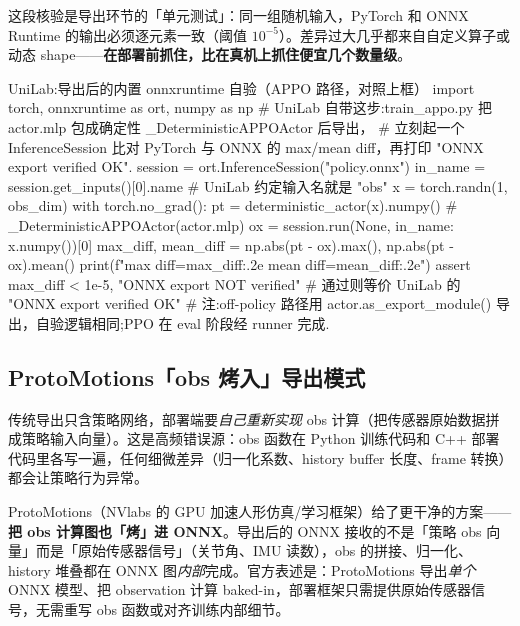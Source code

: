 这段核验是导出环节的「单元测试」：同一组随机输入，PyTorch 和 ONNX Runtime 的输出必须逐元素一致（阈值 $10^{-5}$）。差异过大几乎都来自自定义算子或动态 shape——\textbf{在部署前抓住，比在真机上抓住便宜几个数量级}。

\begin{codebox}[Python]{UniLab:导出后的内置 onnxruntime 自验（APPO 路径，对照上框）}
import torch, onnxruntime as ort, numpy as np
# UniLab 自带这步:train_appo.py 把 actor.mlp 包成确定性 _DeterministicAPPOActor 后导出，
# 立刻起一个 InferenceSession 比对 PyTorch 与 ONNX 的 max/mean diff，再打印 "ONNX export verified OK".
session = ort.InferenceSession("policy.onnx")
in_name = session.get_inputs()[0].name             # UniLab 约定输入名就是 "obs"
x = torch.randn(1, obs_dim)
with torch.no_grad():
    pt = deterministic_actor(x).numpy()            # _DeterministicAPPOActor(actor.mlp)
ox = session.run(None, {in_name: x.numpy()})[0]
max_diff, mean_diff = np.abs(pt - ox).max(), np.abs(pt - ox).mean()
print(f"max diff={max_diff:.2e}  mean diff={mean_diff:.2e}")
assert max_diff < 1e-5, "ONNX export NOT verified"  # 通过则等价 UniLab 的 "ONNX export verified OK"
# 注:off-policy 路径用 actor.as_export_module() 导出，自验逻辑相同;PPO 在 eval 阶段经 runner 完成.
\end{codebox}

\subsection{ProtoMotions「obs 烤入」导出模式}
\label{sec:rlmc-s2r-baked}

传统导出只含策略网络，部署端要\emph{自己重新实现} obs 计算（把传感器原始数据拼成策略输入向量）。这是高频错误源：obs 函数在 Python 训练代码和 C++ 部署代码里各写一遍，任何细微差异（归一化系数、history buffer 长度、frame 转换）都会让策略行为异常。

ProtoMotions（NVlabs 的 GPU 加速人形仿真/学习框架）给了更干净的方案——\textbf{把 obs 计算图也「烤」进 ONNX}\cite{nvlabs_protomotions}。导出后的 ONNX 接收的不是「策略 obs 向量」而是「原始传感器信号」（关节角、IMU 读数），obs 的拼接、归一化、history 堆叠都在 ONNX 图\emph{内部}完成。官方表述是：ProtoMotions 导出\emph{单个} ONNX 模型、把 observation 计算 baked-in，部署框架只需提供原始传感器信号，无需重写 obs 函数或对齐训练内部细节。

